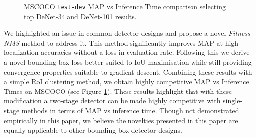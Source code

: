 \documentclass[10pt,twocolumn,letterpaper]{article}
\begin{document}
\begin{figure}[tb] 
\centering
{}
\caption{MSCOCO \texttt{test-dev} MAP vs Inference Time comparison selecting top DeNet-34 and DeNet-101 results.}
\label{fig:mscoco_comp}
\end{figure}

We highlighted an issue in common detector designs and propose a novel \textit{Fitness NMS} method to address it. This method significantly improves MAP at high localization accuracies without a loss in evaluation rate. Following this we derive a novel bounding box loss better suited to IoU maximisation while still providing convergence properties suitable to gradient descent. Combining these results with a simple RoI clustering method, we obtain highly competitive MAP vs Inference Times on  MSCOCO (see Figure \ref{fig:mscoco_comp}). These results highlight that with these modification a two-stage detector can be made highly competitive with single-stage methods in terms of MAP vs inference time. Though not demonstrated empirically in this paper, we believe the novelties presented in this paper are equally applicable to other bounding box detector designs. 

\newpage
{\small


}
\end{document}
